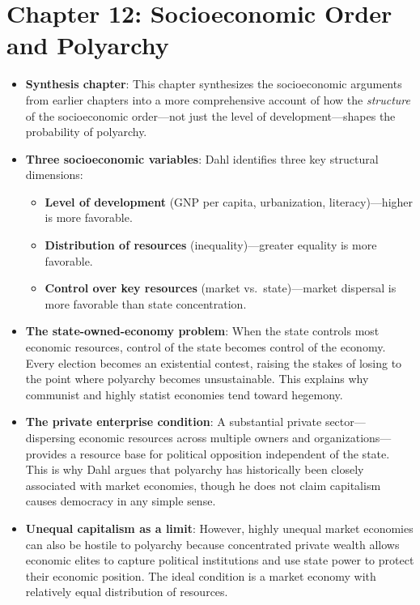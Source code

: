 \documentclass[12pt]{article}
\begin{document}
\section{Chapter 12: Socioeconomic Order and Polyarchy}

\begin{itemize}[leftmargin=*, itemsep=4pt]
    \item \textbf{Synthesis chapter}: This chapter synthesizes the socioeconomic arguments from earlier chapters into a more comprehensive account of how the \emph{structure} of the socioeconomic order---not just the level of development---shapes the probability of polyarchy.
    \item \textbf{Three socioeconomic variables}: Dahl identifies three key structural dimensions:
        \begin{itemize}
            \item \textbf{Level of development} (GNP per capita, urbanization, literacy)---higher is more favorable.
            \item \textbf{Distribution of resources} (inequality)---greater equality is more favorable.
            \item \textbf{Control over key resources} (market vs.\ state)---market dispersal is more favorable than state concentration.
        \end{itemize}
    \item \textbf{The state-owned-economy problem}: When the state controls most economic resources, control of the state becomes control of the economy. Every election becomes an existential contest, raising the stakes of losing to the point where polyarchy becomes unsustainable. This explains why communist and highly statist economies tend toward hegemony.
    \item \textbf{The private enterprise condition}: A substantial private sector---dispersing economic resources across multiple owners and organizations---provides a resource base for political opposition independent of the state. This is why Dahl argues that polyarchy has historically been closely associated with market economies, though he does not claim capitalism causes democracy in any simple sense.
    \item \textbf{Unequal capitalism as a limit}: However, highly unequal market economies can also be hostile to polyarchy because concentrated private wealth allows economic elites to capture political institutions and use state power to protect their economic position. The ideal condition is a market economy with relatively equal distribution of resources.

\end{itemize}
\end{document}
